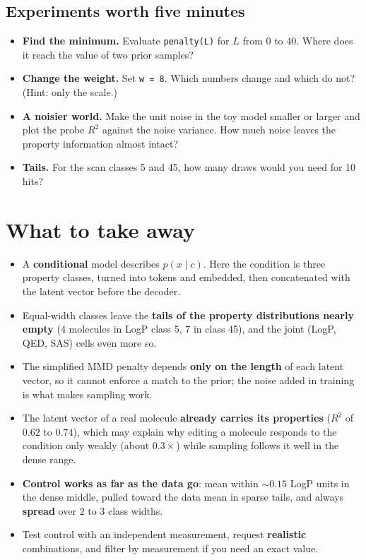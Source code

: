 \documentclass[11pt]{article}
\begin{document}
\subsection{Experiments worth five minutes}
\begin{itemize}[nosep]
  \item \textbf{Find the minimum.} Evaluate \texttt{penalty(L)} for $L$ from $0$ to $40$. Where does it reach the value of two prior samples?
  \item \textbf{Change the weight.} Set \texttt{w = 8}. Which numbers change and which do not? (Hint: only the scale.)
  \item \textbf{A noisier world.} Make the unit noise in the toy model smaller or larger and plot the probe $R^2$ against the noise variance. How much noise leaves the property information almost intact?
  \item \textbf{Tails.} For the scan classes 5 and 45, how many draws would you need for 10 hits?
\end{itemize}

\section{What to take away}
\begin{keybox}[Summary]
\begin{itemize}[nosep]
  \item A \textbf{conditional} model describes $p(x\mid c)$. Here the condition is three property classes, turned into tokens and embedded, then concatenated with the latent vector before the decoder.
  \item Equal-width classes leave the \textbf{tails of the property distributions nearly empty} (4 molecules in LogP class 5, 7 in class 45), and the joint (LogP, QED, SAS) cells even more so.
  \item The simplified MMD penalty depends \textbf{only on the length} of each latent vector, so it cannot enforce a match to the prior; the noise added in training is what makes sampling work.
  \item The latent vector of a real molecule \textbf{already carries its properties} ($R^2$ of $0.62$ to $0.74$), which may explain why editing a molecule responds to the condition only weakly (about $0.3\times$) while sampling follows it well in the dense range.
  \item \textbf{Control works as far as the data go}: mean within $\sim0.15$ LogP units in the dense middle, pulled toward the data mean in sparse tails, and always \textbf{spread} over $2$ to $3$ class widths.
  \item Test control with an independent measurement, request \textbf{realistic} combinations, and filter by measurement if you need an exact value.
\end{itemize}
\end{keybox}
\end{document}
